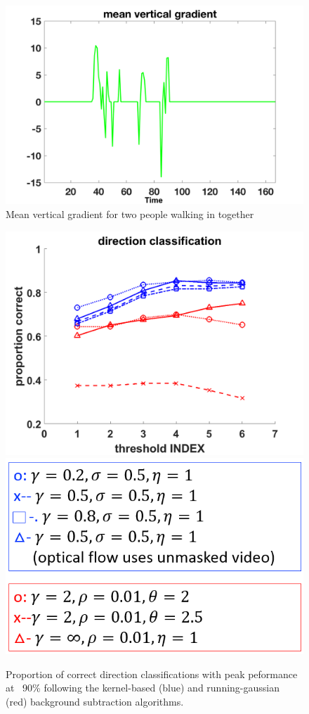 \documentclass[12pt,oneside]{article} %
\begin{document}
\begin{figure}[!htb]
\centering
\includegraphics[scale=0.52]{images/quickoutandin.png}
\caption{Mean vertical gradient for two people walking in together}
\label{together}
\end{figure}

\begin{figure}[!htb]
\centering
\includegraphics[scale=0.4]{images/dirClass.png}
\includegraphics[scale=0.4]{images/legend.png}
\caption{Proportion of correct direction classifications with peak peformance at ~90\%
 following the kernel-based (blue) and running-gaussian (red) background subtraction algorithms.}
\label{dirclass}
\end{figure}
\end{document}
